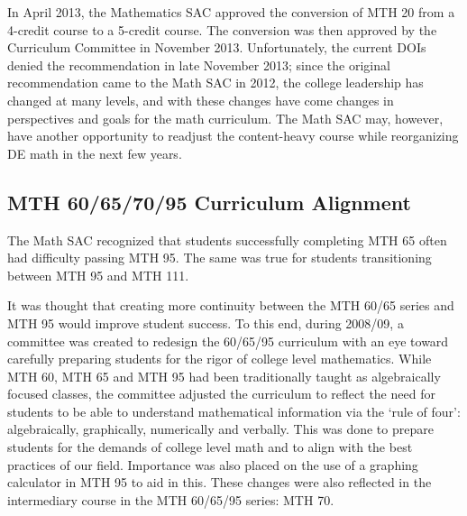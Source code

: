In April 2013, the Mathematics SAC approved the conversion of MTH 20 from a
4-credit course to a 5-credit course.  The conversion was then approved by the
Curriculum Committee in November 2013.  Unfortunately, the current DOIs denied
the recommendation in late November 2013;  since the original recommendation came to
the Math SAC in 2012, the college leadership has changed at many levels, and
with these changes have come changes in perspectives and goals for the math
curriculum.
The Math SAC may,
however, have another opportunity to readjust the content-heavy course while
reorganizing DE math in the next few years. 

\subsection{MTH 60/65/70/95 Curriculum Alignment}
The Math SAC recognized that students successfully completing MTH 65 often had
difficulty passing MTH 95.  The same was true for students transitioning between
MTH 95 and MTH 111.

It was thought that creating more continuity between the MTH 60/65 series and
MTH 95 would improve student success.  To this end, during 2008/09, a committee
was created to redesign the 60/65/95 curriculum with an eye toward carefully
preparing students for the rigor of college level mathematics.  While MTH 60,
MTH 65 and MTH 95 had been traditionally taught as algebraically focused
classes, the committee adjusted the curriculum to reflect the need for students
to be able to understand mathematical information via the `rule of four':
algebraically, graphically, numerically and verbally.  This was done to prepare
students for the demands of college level math and to align with the best
practices of our field.  Importance was also placed on the use of a graphing
calculator in MTH 95 to aid in this.  These changes were also reflected in the
intermediary course in the MTH 60/65/95 series: MTH 70.
 

